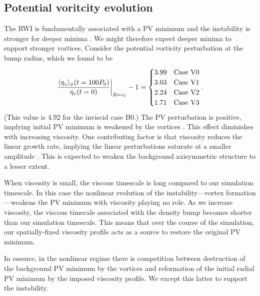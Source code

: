 \subsection{Potential voritcity evolution}
The RWI is fundamentally associated with a PV minimum and the
instability is stronger for deeper minima \citep{li00}. We might
therefore expect deeper minima to support stronger vortices. 
Consider the potential vorticity perturbation at the bump radius,
which we found to be  
\begin{align}\label{vortensity_pert}
  \left.\frac{\langle \eta_z \rangle_\phi(t=100P_0)}{\eta_z(t=0)}\right|_{R=r_0} - 1 = 
  \begin{cases}
    3.99  & \text{Case V0} \\
   3.03  & \text{Case V1} \\
   2.24  & \text{Case V2} \\
   1.71  & \text{Case V3} \\
  \end{cases}.
\end{align} 
(This value is 4.92 for the inviscid case B0.) The PV
perturbation is positive, implying initial PV minimum is weakened
by the vortices \citep{meheut10}. This effect
diminishes with increasing viscosity. One contributing factor is 
that viscosity reduces the linear growth rate, implying the linear
perturbations saturate at a smaller amplitude \citep{meheut13}. This
is expected to weaken the background axisymmetric structure to a lesser
extent.    



When viscosity is small, the viscous timescale is long compared to our
simulation timescale. In this case the nonlinear evolution of the
instability---vortex formation---weakens the PV minimum with viscosity
playing no role. As we increase viscosity, the viscous timecale
associated with the density bump becomes shorter than our simulation
timescale. %
This means that over the course of the simulation, our spatially-fixed
viscosity profile acts as a source to restore the original PV minimum. 

In essence, in the nonlinear regime there is competition
between destruction of the background PV minimum by the
vortices and reformation of the initial radial PV minimum by the
imposed viscosity profile. We except this latter to support the
instability. 
 



